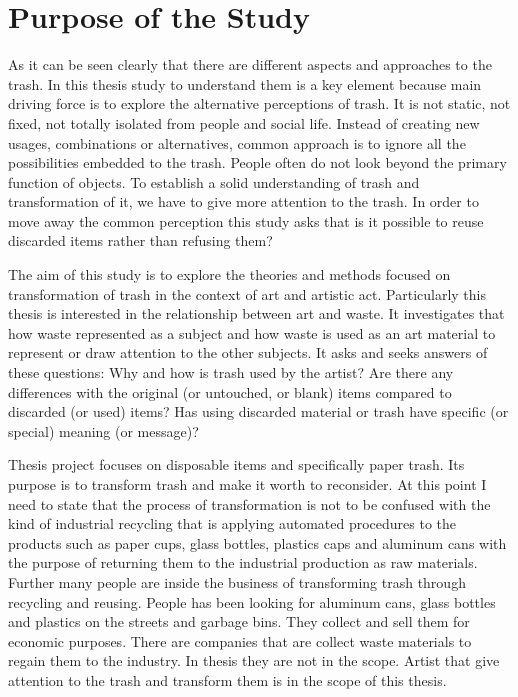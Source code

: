 \section{Purpose of the Study}
As it can be seen clearly that there are different aspects and approaches to the trash. In this thesis study to understand them is a key element because main driving force is to explore the alternative perceptions of trash. It is not static, not fixed, not totally isolated from people and social life. Instead of creating new usages, combinations or alternatives, common approach is to ignore all the possibilities embedded to the trash. People often do not look beyond the primary function of objects. To establish a solid understanding of trash and transformation of it, we have to give more attention to the trash. In order to move away the common perception this study asks that is it possible to reuse discarded items rather than refusing them?

The aim of this study is to explore the theories and methods focused on transformation of trash in the context of art and artistic act. Particularly this thesis is interested in the relationship between art and waste. It investigates that how waste represented as a subject and how waste is used as an art material to represent or draw attention to the other subjects. It asks and seeks answers of these questions: Why and how is trash used by the artist? Are there any differences with the original (or untouched, or blank) items compared to discarded (or used) items? Has using discarded material or trash have specific (or special) meaning (or message)?

Thesis project focuses on disposable items and specifically paper trash. Its purpose is to transform trash and make it worth to reconsider. At this point I need to state that the process of transformation is not to be confused with the kind of industrial recycling that is applying automated procedures to the products such as paper cups, glass bottles, plastics caps and aluminum cans with the purpose of returning them to the industrial production as raw materials. Further many people are inside the business of transforming trash through recycling and reusing. People has been looking for aluminum cans, glass bottles and plastics on the streets and garbage bins. They collect and sell them for economic purposes. There are companies that are collect waste materials to regain them to the industry. In thesis they are not in the scope. Artist that give attention to the trash and transform them is in the scope of this thesis.



